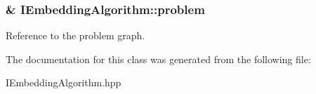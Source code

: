 \subsubsection[{\texorpdfstring{problem}{problem}}]{\& I\+Embedding\+Algorithm\+::problem\hspace{0.3cm}{\ttfamily [protected]}}\hypertarget{a00071_a279b1546d6d308ccfa104a70fb6f8474}{}\label{a00071_a279b1546d6d308ccfa104a70fb6f8474}
Reference to the problem graph. 

The documentation for this class was generated from the following file\+:\begin{DoxyCompactItemize}
\item 
I\+Embedding\+Algorithm.\+hpp\end{DoxyCompactItemize}
